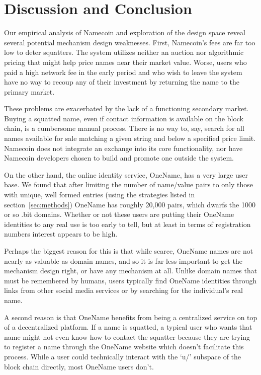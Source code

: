 \section{Discussion and Conclusion}
\label{sec:conclusion}

Our empirical analysis of Namecoin and exploration of the design space reveal several potential mechanism design weaknesses. First, Namecoin's fees are far too low to deter squatters. The system utilizes neither an auction nor algorithmic pricing that might help price names near their market value. Worse, users who paid a high network fee in the early period and who wish to leave the system have no way to recoup any of their investment by returning the name to the primary market.

These problems are exacerbated by the lack of a functioning secondary market. Buying a squatted name, even if contact information is available on the block chain, is a cumbersome manual process. There is no way to, say, search for all names available for sale matching a given string and below a specified price limit. Namecoin does not integrate an exchange into its core functionality, nor have Namecoin developers chosen to build and promote one outside the system.

On the other hand, the online identity service, OneName, has a very large user base. We found that after limiting the number of name/value pairs to only those with unique, well formed entries (using the strategies listed in section~\ref{sec:methods}) OneName has roughly 20,000 pairs, which dwarfs the 1000 or so .bit domains. Whether or not these users are putting their OneName identities to any real use is too early to tell, but at least in terms of registration numbers interest appears to be high.

Perhaps the biggest reason for this is that while scarce, OneName names are not nearly as valuable as domain names, and so it is far less important to get the mechanism design right, or have any mechanism at all. Unlike domain names that must be remembered by humans, users typically find OneName identities through links from other social media services or by searching for the individual's real name.

A second reason is that OneName benefits from being a centralized service on top of a decentralized platform. If a name is squatted, a typical user who wants that name might not even know how to contact the squatter because they are trying to register a name through the OneName website which doesn't facilitate this process. While a user could technically interact with the `u/' subspace of the block chain directly, most OneName users don't.

